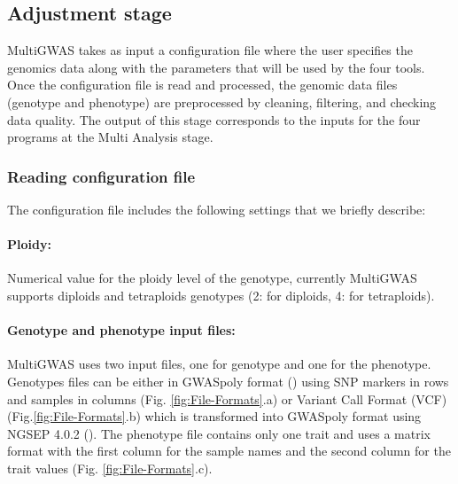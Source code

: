 \documentclass{article}
\begin{document}


\subsection{Adjustment stage}

MultiGWAS takes as input a configuration file where the user specifies the genomics data along with the parameters that will be used by the four tools. Once the configuration file is read and processed, the genomic data files (genotype and phenotype) are preprocessed by cleaning, filtering, and checking data quality. The output of this stage corresponds to the inputs for the four programs at the Multi Analysis stage.


\subsubsection{Reading configuration file\label{section-Reading-configuration-file}}

The configuration file includes the following settings that we briefly describe:%

\paragraph{{Ploidy:}} Numerical value for the ploidy level of the genotype, currently MultiGWAS supports diploids and tetraploids genotypes (2: for diploids, 4: for tetraploids).

\paragraph{{Genotype and phenotype input files:}}

MultiGWAS uses two input files, one for genotype and one for the phenotype. Genotypes files can be either in GWASpoly format (\cite{Rosyara2016}) using SNP markers in rows and samples in columns (Fig. \ref{fig:File-Formats}.a) or Variant Call Format (VCF) (Fig.\ref{fig:File-Formats}.b) which is transformed into GWASpoly format using NGSEP 4.0.2 (\cite{Duitama2019}). The phenotype file contains only one trait and uses a matrix format with the first column for the sample names and the second column for the trait values (Fig. \ref{fig:File-Formats}.c).
\end{document}

